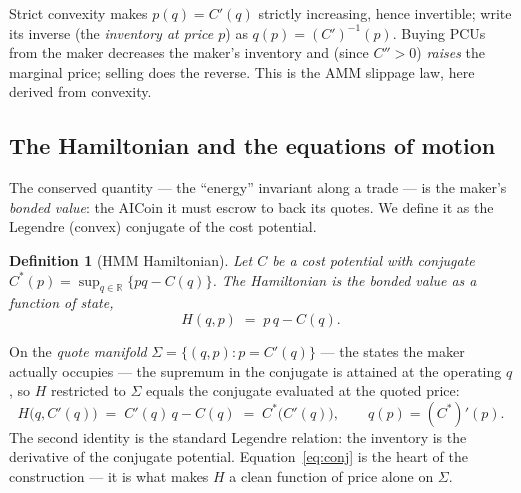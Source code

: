 \documentclass[11pt]{article}
\newtheorem{definition}{Definition}
\newcommand{\R}{\ensuremath{\mathbb{R}}}
\newcommand{\Cstar}{\ensuremath{C^{*}}}
\begin{document}
Strict convexity makes $p(q)=C'(q)$ strictly increasing, hence invertible; write
its inverse (the \emph{inventory at price $p$}) as $q(p) = (C')^{-1}(p)$.
Buying PCUs from the maker decreases the maker's inventory and (since $C''>0$)
\emph{raises} the marginal price; selling does the reverse. This is the AMM
slippage law, here derived from convexity.

\subsection{The Hamiltonian and the equations of motion}

The conserved quantity --- the ``energy'' invariant along a trade --- is the maker's
\emph{bonded value}: the AICoin it must escrow to back its quotes. We define it as
the Legendre (convex) conjugate of the cost potential.

\begin{definition}[HMM Hamiltonian]
\label{def:ham}
Let $C$ be a cost potential with conjugate
$\Cstar(p) = \sup_{q\in\R}\{pq - C(q)\}$. The \emph{Hamiltonian} is the bonded
value as a function of state,
\begin{equation}
H(q,p) \;=\; p\,q - C(q).
\label{eq:ham}
\end{equation}
\end{definition}

On the \emph{quote manifold} $\Sigma = \{(q,p): p = C'(q)\}$ --- the states the
maker actually occupies --- the supremum in the conjugate is attained at the
operating $q$, so $H$ restricted to $\Sigma$ equals the conjugate evaluated at the
quoted price:
\begin{equation}
H\big(q, C'(q)\big) \;=\; C'(q)\,q - C(q) \;=\; \Cstar\big(C'(q)\big),
\qquad q(p) = (\Cstar)'(p).
\label{eq:conj}
\end{equation}
The second identity is the standard Legendre relation: the inventory is the
derivative of the conjugate potential. Equation~\eqref{eq:conj} is the heart of the
construction --- it is what makes $H$ a clean function of price alone on $\Sigma$.
\end{document}
